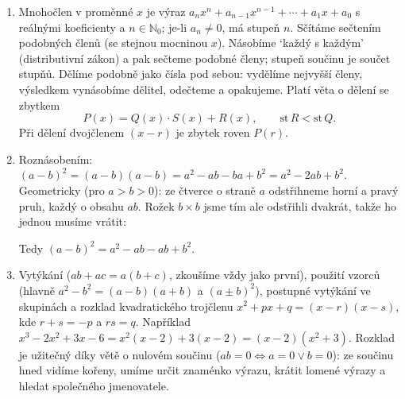 \begin{enumerate}[label=\textbf{\arabic*.}, leftmargin=*, itemsep=0.8em]
  \item {}
  Mnohočlen v proměnné $x$ je výraz $a_nx^n + a_{n-1}x^{n-1} + \cdots + a_1x + a_0$ s reálnými koeficienty a $n\in\mathbb{N}_0$; je-li $a_n\neq 0$, má stupeň $n$. Sčítáme sečtením podobných členů (se stejnou mocninou $x$). Násobíme `každý s každým' (distributivní zákon) a pak sečteme podobné členy; stupeň součinu je součet stupňů. Dělíme podobně jako čísla pod sebou: vydělíme nejvyšší členy, výsledkem vynásobíme dělitel, odečteme a opakujeme. Platí věta o dělení se zbytkem
  \begin{equation*}
    P(x) = Q(x)\cdot S(x) + R(x), \qquad \text{st}\,R < \text{st}\,Q.
  \end{equation*}
  Při dělení dvojčlenem $(x - r)$ je zbytek roven $P(r)$. 

  \item {}
  Roznásobením: ${(a - b)}^2 = (a - b)(a - b) = a^2 - ab - ba + b^2 = a^2 - 2ab + b^2$. Geometricky (pro $a > b > 0$): ze čtverce o straně $a$ odstřihneme horní a pravý pruh, každý o obsahu $ab$. Rožek $b\times b$ jsme tím ale odstřihli dvakrát, takže ho jednou musíme vrátit:
  \begin{center}
  \end{center}
  Tedy ${(a - b)}^2 = a^2 - ab - ab + b^2$. 

  \item {}
  Vytýkání ($ab + ac = a(b + c)$, zkoušíme vždy jako první), použití vzorců (hlavně $a^2 - b^2 = (a - b)(a + b)$ a ${(a\pm b)}^2$), postupné vytýkání ve skupinách a rozklad kvadratického trojčlenu $x^2 + px + q = (x - r)(x - s)$, kde $r + s = -p$ a $rs = q$. Například $x^3 - 2x^2 + 3x - 6 = x^2(x - 2) + 3(x - 2) = (x - 2)(x^2 + 3)$. Rozklad je užitečný díky větě o nulovém součinu ($ab = 0 \Leftrightarrow a = 0\lor b = 0$): ze součinu hned vidíme kořeny, umíme určit znaménko výrazu, krátit lomené výrazy a hledat společného jmenovatele. 


\end{enumerate}
